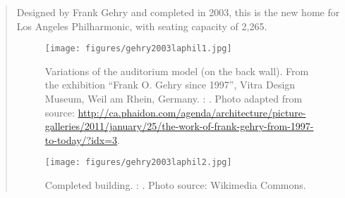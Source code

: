 \clearpage
{}
		\begin{quote}
		\small
		Designed by Frank Gehry and completed in 2003, this is the new home for
		Los Angeles Philharmonic, with seating capacity of 2,265.
		
		\begin{figure}[htb]
		\begin{center}
		\texttt{[image: figures/gehry2003laphil1.jpg]}
		\caption{
		Variations of the auditorium model (on the back wall).
		From the exhibition ``Frank O. Gehry since 1997'', Vitra Design Museum, Weil am Rhein, Germany.
		\citeauthor{gehry2003laphil}: 
		\cite{gehry2003laphil}.
		Photo adapted from source: 
		\url{http://ca.phaidon.com/agenda/architecture/picture-galleries/2011/january/25/the-work-of-frank-gehry-from-1997-to-today/?idx=3}. 		
		}		
		\label{fig:gehry2003laphil}
		\end{center}
		\end{figure}		

		\begin{figure}[htb]
		\begin{center}
		\texttt{[image: figures/gehry2003laphil2.jpg]}
		\caption{
		Completed building.
		\citeauthor{gehry2003laphil}: 
		\cite{gehry2003laphil}.
		Photo source: Wikimedia Commons. 
		}		
		\label{fig:gehry2003laphil2}
		\end{center}
		\end{figure}		
				
		\end{quote}



